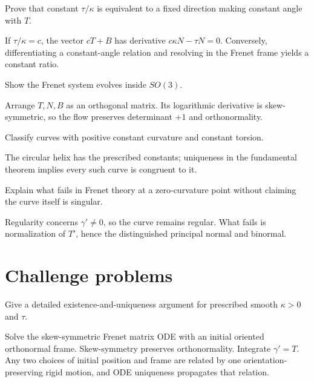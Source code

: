 \begin{problem}\label{prob:vii13-09}
Prove that constant \(\tau/\kappa\) is equivalent to a fixed direction making constant angle with \(T\).
\end{problem}
\begin{solution}
If \(\tau/\kappa=c\), the vector \(cT+B\) has derivative \(c\kappa N-\tau N=0\). Conversely, differentiating a constant-angle relation and resolving in the Frenet frame yields a constant ratio.
\end{solution}

\begin{problem}\label{prob:vii13-10}
Show the Frenet system evolves inside \(SO(3)\).
\end{problem}
\begin{solution}
Arrange \(T,N,B\) as an orthogonal matrix. Its logarithmic derivative is skew-symmetric, so the flow preserves determinant \(+1\) and orthonormality.
\end{solution}

\begin{problem}\label{prob:vii13-11}
Classify curves with positive constant curvature and constant torsion.
\end{problem}
\begin{solution}
The circular helix has the prescribed constants; uniqueness in the fundamental theorem implies every such curve is congruent to it.
\end{solution}

\begin{problem}\label{prob:vii13-12}
Explain what fails in Frenet theory at a zero-curvature point without claiming the curve itself is singular.
\end{problem}
\begin{solution}
Regularity concerns \(\gamma'\neq0\), so the curve remains regular. What fails is normalization of \(T'\), hence the distinguished principal normal and binormal.
\end{solution}

\section{Challenge problems}
\begin{problem}\label{prob:vii13-ch01}
Give a detailed existence-and-uniqueness argument for prescribed smooth \(\kappa>0\) and \(\tau\).
\end{problem}
\begin{solution}
Solve the skew-symmetric Frenet matrix ODE with an initial oriented orthonormal frame. Skew-symmetry preserves orthonormality. Integrate \(\gamma'=T\). Any two choices of initial position and frame are related by one orientation-preserving rigid motion, and ODE uniqueness propagates that relation.
\end{solution}

